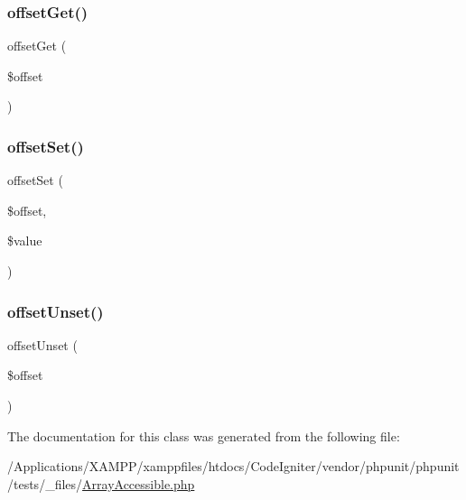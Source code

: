 \subsubsection{\texorpdfstring{offset\+Get()}{offsetGet()}}
{\footnotesize\ttfamily offset\+Get (\begin{DoxyParamCaption}\item[{}]{\$offset }\end{DoxyParamCaption})}

\mbox{\label{class_array_accessible_ac6bde6b1eb50eb5377e91771fe46b7a3}} 
\subsubsection{\texorpdfstring{offset\+Set()}{offsetSet()}}
{\footnotesize\ttfamily offset\+Set (\begin{DoxyParamCaption}\item[{}]{\$offset,  }\item[{}]{\$value }\end{DoxyParamCaption})}

\mbox{\label{class_array_accessible_a2411227ea7118b13495de9839fd4b563}} 
\subsubsection{\texorpdfstring{offset\+Unset()}{offsetUnset()}}
{\footnotesize\ttfamily offset\+Unset (\begin{DoxyParamCaption}\item[{}]{\$offset }\end{DoxyParamCaption})}



The documentation for this class was generated from the following file\+:\begin{DoxyCompactItemize}
\item 
/\+Applications/\+X\+A\+M\+P\+P/xamppfiles/htdocs/\+Code\+Igniter/vendor/phpunit/phpunit/tests/\+\_\+files/\mbox{\hyperlink{_array_accessible_8php}{Array\+Accessible.\+php}}\end{DoxyCompactItemize}
